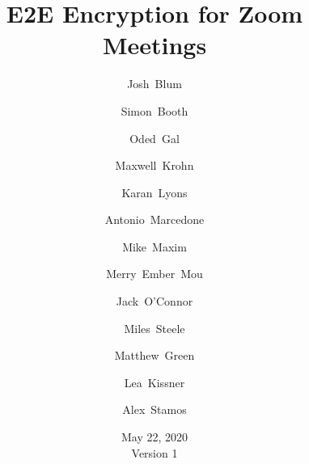 \documentclass[11pt]{article}
\title{E2E Encryption for Zoom Meetings}
\author[1]{\small Josh~Blum}
\author[1]{\small Simon~Booth}
\author[1]{\small Oded~Gal}
\author[1]{\small Maxwell~Krohn}
\author[1]{\small Karan~Lyons}
\author[1]{\small Antonio~Marcedone}
\author[1]{\small Mike~Maxim}
\author[1]{\small Merry~Ember~Mou}
\author[1]{\small Jack~O'Connor}
\author[1]{\small Miles~Steele}
\author[2]{\small Matthew~Green}
\author[  \hspace{-1ex}]{\small Lea~Kissner}
\author[3]{\small Alex~Stamos}
\affil[1]{\footnotesize Zoom~Video~Communications}
\affil[2]{\footnotesize Johns~Hopkins~University}
\affil[3]{\footnotesize Stanford~University}
\date{May 22, 2020 \\ \small Version 1}
\begin{document}
    \maketitle
    \thispagestyle{fancy}
    \renewcommand{\thesection}{\arabic{section}} 
    \renewcommand{\thesubsection}{\thesection.\arabic{subsection}}
    
    \newpage
    
    
    
    
    
    
    
    \pagebreak
    
\end{document}
